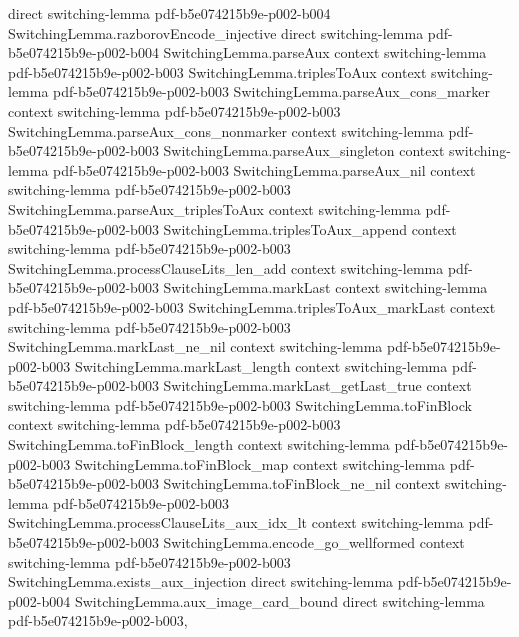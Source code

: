 \begin{theorem}
  {direct}
  {switching-lemma}
  {pdf-b5e074215b9e-p002-b004}
\proofstep
  {SwitchingLemma.razborovEncode_injective}
  {direct}
  {switching-lemma}
  {pdf-b5e074215b9e-p002-b004}
\proofstep
  {SwitchingLemma.parseAux}
  {context}
  {switching-lemma}
  {pdf-b5e074215b9e-p002-b003}
\proofstep
  {SwitchingLemma.triplesToAux}
  {context}
  {switching-lemma}
  {pdf-b5e074215b9e-p002-b003}
\proofstep
  {SwitchingLemma.parseAux_cons_marker}
  {context}
  {switching-lemma}
  {pdf-b5e074215b9e-p002-b003}
\proofstep
  {SwitchingLemma.parseAux_cons_nonmarker}
  {context}
  {switching-lemma}
  {pdf-b5e074215b9e-p002-b003}
\proofstep
  {SwitchingLemma.parseAux_singleton}
  {context}
  {switching-lemma}
  {pdf-b5e074215b9e-p002-b003}
\proofstep
  {SwitchingLemma.parseAux_nil}
  {context}
  {switching-lemma}
  {pdf-b5e074215b9e-p002-b003}
\proofstep
  {SwitchingLemma.parseAux_triplesToAux}
  {context}
  {switching-lemma}
  {pdf-b5e074215b9e-p002-b003}
\proofstep
  {SwitchingLemma.triplesToAux_append}
  {context}
  {switching-lemma}
  {pdf-b5e074215b9e-p002-b003}
\proofstep
  {SwitchingLemma.processClauseLits_len_add}
  {context}
  {switching-lemma}
  {pdf-b5e074215b9e-p002-b003}
\proofstep
  {SwitchingLemma.markLast}
  {context}
  {switching-lemma}
  {pdf-b5e074215b9e-p002-b003}
\proofstep
  {SwitchingLemma.triplesToAux_markLast}
  {context}
  {switching-lemma}
  {pdf-b5e074215b9e-p002-b003}
\proofstep
  {SwitchingLemma.markLast_ne_nil}
  {context}
  {switching-lemma}
  {pdf-b5e074215b9e-p002-b003}
\proofstep
  {SwitchingLemma.markLast_length}
  {context}
  {switching-lemma}
  {pdf-b5e074215b9e-p002-b003}
\proofstep
  {SwitchingLemma.markLast_getLast_true}
  {context}
  {switching-lemma}
  {pdf-b5e074215b9e-p002-b003}
\proofstep
  {SwitchingLemma.toFinBlock}
  {context}
  {switching-lemma}
  {pdf-b5e074215b9e-p002-b003}
\proofstep
  {SwitchingLemma.toFinBlock_length}
  {context}
  {switching-lemma}
  {pdf-b5e074215b9e-p002-b003}
\proofstep
  {SwitchingLemma.toFinBlock_map}
  {context}
  {switching-lemma}
  {pdf-b5e074215b9e-p002-b003}
\proofstep
  {SwitchingLemma.toFinBlock_ne_nil}
  {context}
  {switching-lemma}
  {pdf-b5e074215b9e-p002-b003}
\proofstep
  {SwitchingLemma.processClauseLits_aux_idx_lt}
  {context}
  {switching-lemma}
  {pdf-b5e074215b9e-p002-b003}
\proofstep
  {SwitchingLemma.encode_go_wellformed}
  {context}
  {switching-lemma}
  {pdf-b5e074215b9e-p002-b003}
\proofstep
  {SwitchingLemma.exists_aux_injection}
  {direct}
  {switching-lemma}
  {pdf-b5e074215b9e-p002-b004}
\proofstep
  {SwitchingLemma.aux_image_card_bound}
  {direct}
  {switching-lemma}
  {pdf-b5e074215b9e-p002-b003,
}
\end{theorem}
